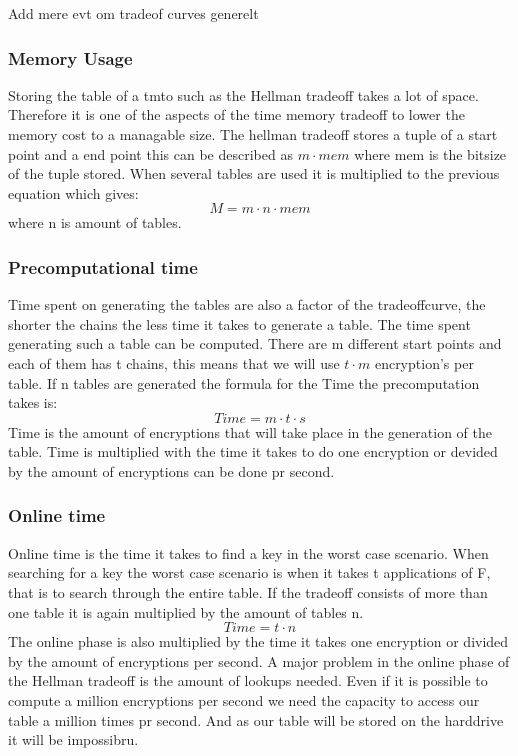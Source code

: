 Add mere evt om tradeof curves generelt
\subsubsection{Memory Usage}
Storing the table of a tmto such as the Hellman tradeoff takes a lot of space. Therefore it is one of the aspects of the time memory tradeoff to lower the memory cost to a managable size. The hellman tradeoff stores a tuple of a start point and a end point this can be described as $m\cdot mem$ where mem is the bitsize of the  tuple stored. When several tables are used it is multiplied to the previous equation which gives:
\begin{equation}
M=m\cdot n\cdot mem
\end{equation}
where n is amount of tables.
\subsubsection{Precomputational time}
Time spent on generating the tables are also a factor of the tradeoffcurve, the shorter the chains the less time it takes to generate a table. The time spent generating such a table can be computed. There are m different start points and each of them has t chains, this means that we will use $t\cdot m$ encryption's per table. If n tables are generated the formula for the Time the precomputation takes is:
\begin{equation}
  Time=m\cdot t\cdot s
\end{equation}
Time is the amount of encryptions that will take place in the generation of the table. Time is multiplied with the time it takes to do one encryption or devided by the amount of encryptions can be done pr second.

\subsubsection{Online time}
Online time is the time it takes to find a key in the worst case scenario. When searching for a key the worst case scenario is when it takes t applications of F, that is to search through the entire table. If the tradeoff consists of more than one table it is again multiplied by the amount of tables n.
\begin{equation}
  Time=t\cdot n
\end{equation}
The online phase is also multiplied by the time it takes one encryption or divided by the amount of encryptions per second. A major problem in the online phase of the  Hellman tradeoff is the amount of lookups needed. Even if it is possible to compute a million encryptions per second we need the capacity to access our table a million times pr second. And as our table will be stored on the harddrive it will be impossibru.



